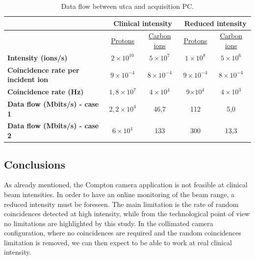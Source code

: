{\begin{table} [!htbp]
\centering
\caption{Data flow between \gls{utca} and acquisition PC.}
\label{chapappA::tab::dataFlowuTCAPC}
\begin{tabular}{m{3.5cm} c c c c}
\toprule
\rowcolor{myColorMainA!20}
		&\multicolumn{2}{c}{	\textbf{Clinical intensity}} &\multicolumn{2}{c}{ \textbf{Reduced intensity}} \\
\midrule
		& \underline{Protons}& \underline{Carbon ions} & \underline{Protons}& \underline{Carbon ions} \\
\midrule
\textbf{Intensity (ions/s)}		& $2\times10^{10}$	&$5\times10^{7}$  & $1\times10^{8}$& $5\times10^{6}$\\
\textbf{Coincidence rate per incident ion}		& $9\times10^{-4}$&  $8\times10^{-4}$&  $9\times10^{-4}$& $8\times10^{-4}$ \\
\textbf{Coincidence rate (Hz)}		& $1,8\times10^{7}$&  $4\times10^{4}$&  9$\times10^{4}$& $4\times10^{3}$\\
\textbf{Data flow (Mbits/s) - case 1}		&$2,2\times10^{4}$ &  46,7&  112& 5,0\\
\textbf{Data flow (Mbits/s) - case 2}		& $6\times10^{4}$&  133&  300& 13,3\\
\bottomrule
\end{tabular}
\end{table}

\subsection{Conclusions}\label{chapappA::subsec::conclusions}

As already mentioned, the Compton camera application is not feasible at clinical beam intensities. \newline
In order to have an online monitoring of the beam range, a reduced intensity must be foreseen. The main limitation is the rate of random coincidences detected at high intensity, while from the technological point of view no limitations are highlighted by this study. In the collimated camera configuration, where no coincidences are required and the random coincidences limitation is removed, we can then expect to be able to work at real clinical intensity.


}
